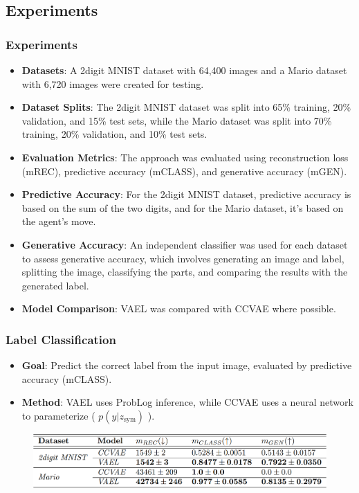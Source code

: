 \documentclass[10pt,xcolor={dvipsnames}]{beamer}
\begin{document}
\begin{frame}
    \subsection{Experiments}
    \frametitle{Experiments}
    \begin{itemize}
        \item \textbf{Datasets}: A 2digit MNIST dataset with 64,400 images and a Mario dataset with 6,720 images were created for testing.
        \item \textbf{Dataset Splits}: The 2digit MNIST dataset was split into 65\% training, 20\% validation, and 15\% test sets, while the Mario dataset was split into 70\% training, 20\% validation, and 10\% test sets.
        \item \textbf{Evaluation Metrics}: The approach was evaluated using reconstruction loss (mREC), predictive accuracy (mCLASS), and generative accuracy (mGEN).
        \item \textbf{Predictive Accuracy}: For the 2digit MNIST dataset, predictive accuracy is based on the sum of the two digits, and for the Mario dataset, it’s based on the agent’s move.
        \item \textbf{Generative Accuracy}: An independent classifier was used for each dataset to assess generative accuracy, which involves generating an image and label, splitting the image, classifying the parts, and comparing the results with the generated label.
        \item \textbf{Model Comparison}: VAEL was compared with CCVAE where possible.
    \end{itemize}
\end{frame}


\begin{frame}
    \frametitle{Label Classification}
    \begin{itemize}
        \item \textbf{Goal}: Predict the correct label from the input image, evaluated by predictive accuracy (mCLASS).
        \item \textbf{Method}: VAEL uses ProbLog inference, while CCVAE uses a neural network to parameterize ( $p(y|z_{\text{sym}})$ ).
    \end{itemize}
    \begin{figure}[htb]
        \centering
        \includegraphics[width=1\textwidth]{figures/table.png}
    \end{figure}
\end{frame}
\end{document}
